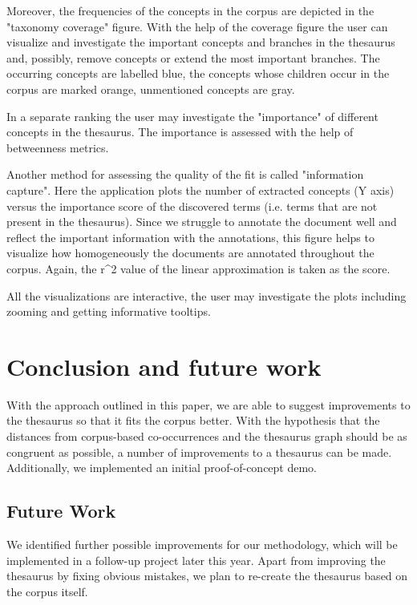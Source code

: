 \documentclass[runningheads,a4paper]{llncs}
\begin{document}
Moreover, the frequencies of the concepts in the corpus are depicted in the "taxonomy coverage" figure. With the help of the coverage figure the user can visualize and investigate the important concepts and branches in the thesaurus and, possibly, remove concepts or extend the most important branches. The occurring concepts are labelled blue, the concepts whose children occur in the corpus are marked orange, unmentioned concepts are gray.

In a separate ranking the user may investigate the "importance" of different concepts in the thesaurus. The importance is assessed with the help of betweenness metrics.

Another method for assessing the quality of the fit is called "information capture". Here the application plots the number of extracted concepts (Y axis) versus the importance score of the discovered terms (i.e. terms that are not present in the thesaurus). Since we struggle to annotate the document well and reflect the important information with the annotations, this figure helps to visualize how homogeneously the documents are annotated throughout the corpus. Again, the r\textasciicircum2 value of the linear approximation is taken as the score.

All the visualizations are interactive, the user may investigate the plots including zooming and getting informative tooltips.

\section{Conclusion and future work}

With the approach outlined in this paper, we are able to suggest improvements to the thesaurus so that it fits the corpus better. With the hypothesis that the distances from corpus-based co-occurrences and the thesaurus graph should be as congruent as possible, a number of improvements to a thesaurus can be made. Additionally, we implemented an initial proof-of-concept demo.

\subsection{Future Work}

We identified further possible improvements for our methodology, which will be implemented in a follow-up project later this year. Apart from improving the thesaurus by fixing obvious mistakes, we plan to re-create the thesaurus based on the corpus itself.
\end{document}
